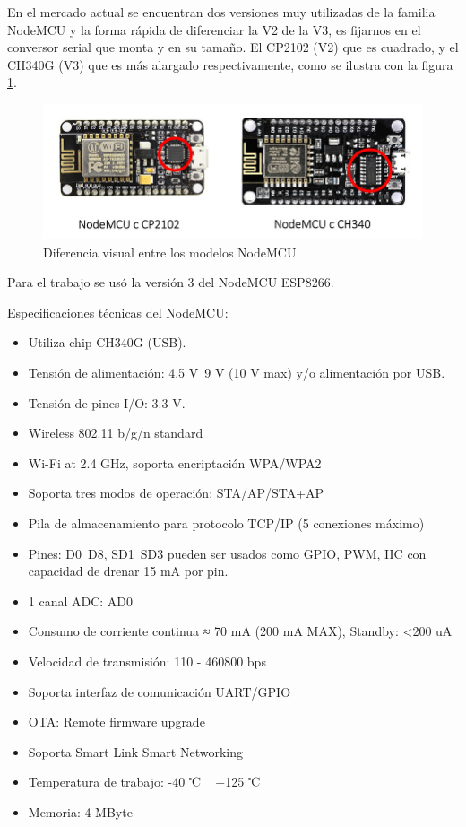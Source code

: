 En el mercado actual se encuentran dos versiones muy utilizadas de la familia NodeMCU y la forma rápida de diferenciar la V2 de la V3, es fijarnos en el conversor serial que monta y en su tamaño. El CP2102 (V2) que es cuadrado, y el CH340G (V3) que es más alargado respectivamente, como se ilustra con la figura \ref{fig:nodemcu}.
 

\begin{figure}[htbp]
	\centering
	\includegraphics[width=.85\textwidth]{./Figures/NodeMcu.jpg}
	\caption{Diferencia visual entre los modelos NodeMCU.}

	\label{fig:nodemcu}
\end{figure}

Para el trabajo se usó la versión 3 del NodeMCU ESP8266.

Especificaciones técnicas del NodeMCU:

\begin{itemize}
\item Utiliza chip CH340G (USB).
\item Tensión de alimentación: 4.5 V~9 V (10 V max) y/o alimentación por USB.
\item Tensión de pines I/O: 3.3 V.
\item Wireless 802.11 b/g/n standard
\item Wi-Fi at 2.4 GHz, soporta encriptación WPA/WPA2
\item Soporta tres modos de operación: STA/AP/STA+AP
\item Pila de almacenamiento para protocolo TCP/IP (5 conexiones máximo)
\item Pines: D0~D8, SD1~SD3 pueden ser usados como GPIO, PWM, IIC con capacidad de drenar 15 mA por pin.
\item 1 canal ADC: AD0
\item Consumo de corriente continua ≈ 70 mA (200 mA MAX), Standby: <200 uA
\item Velocidad de transmisión: 110 - 460800 bps
\item Soporta interfaz de comunicación UART/GPIO
\item OTA: Remote firmware upgrade
\item Soporta Smart Link Smart Networking
\item Temperatura de trabajo: -40 ℃ ~ +125 ℃
\item Memoria: 4 MByte
\end{itemize}

